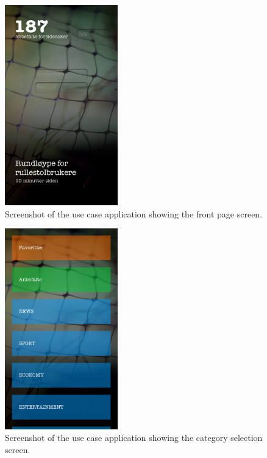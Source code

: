 \begin{figure}[!htbp]
\centering
\includegraphics[width=49mm]{GFX/usecase/front.png}
\caption{Screenshot of the use case application showing the front page screen.}
\label{usecase_frontpage}
\end{figure}

\begin{figure}[!htbp]
\centering
\includegraphics[width=49mm]{GFX/usecase/category.png}
\caption{Screenshot of the use case application showing the category selection screen.}
\label{usecase_category}
\end{figure}

